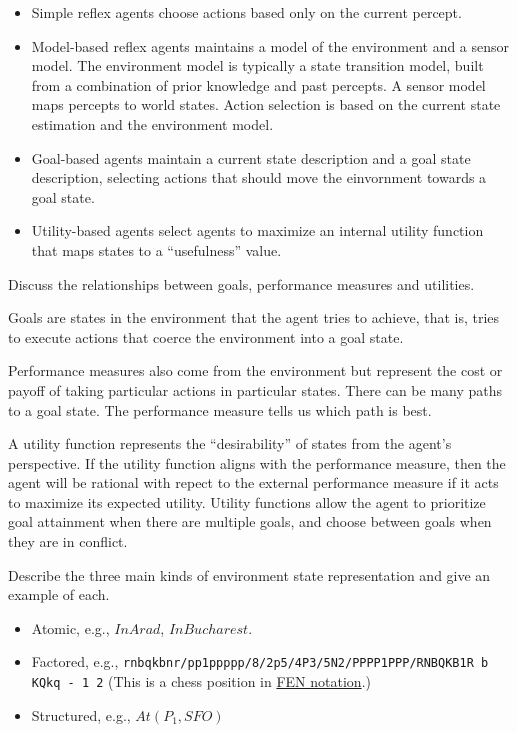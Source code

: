 \begin{questions}
\begin{solution}[2.75in]
\begin{itemize}
\item Simple reflex agents choose actions based only on the current percept.
\item Model-based reflex agents maintains a model of the environment and a sensor model. The environment model is typically a state transition model, built from a combination of prior knowledge and past percepts.  A sensor model maps percepts to world states.  Action selection is based on the current state estimation and the environment model.
\item Goal-based agents maintain a current state description and a goal state description, selecting actions that should move the einvornment towards a goal state.
\item Utility-based agents select agents to maximize an internal utility function that maps states to a ``usefulness'' value.
\end{itemize}
\end{solution}

\question Discuss the relationships between goals, performance measures and utilities.

\begin{solution}[2.75in]
Goals are states in the environment that the agent tries to achieve, that is, tries to execute actions that coerce the environment into a goal state.

Performance measures also come from the environment but represent the cost or payoff of taking particular actions in particular states.  There can be many paths to a goal state.  The performance measure tells us which path is best.

A utility function represents the ``desirability'' of states from the agent's perspective.  If the utility function aligns with the performance measure, then the agent will be rational with repect to the external performance measure if it acts to maximize its expected utility.  Utility functions allow the agent to prioritize goal attainment when there are multiple goals, and choose between goals when they are in conflict.
\end{solution}

\question Describe the three main kinds of environment state representation and give an example of each.

\begin{solution}[2.5in]
\begin{itemize}
\item Atomic, e.g., $InArad$, $InBucharest$.

\item Factored, e.g., {\tt rnbqkbnr/pp1ppppp/8/2p5/4P3/5N2/PPPP1PPP/RNBQKB1R b KQkq - 1 2} (This is a chess position in \href{https://en.wikipedia.org/wiki/Forsyth%E2%80%93Edwards_Notation}{FEN notation}.)

\item Structured, e.g., $At(P_1, SFO)$
\end{itemize}

\end{solution}


\end{questions}


